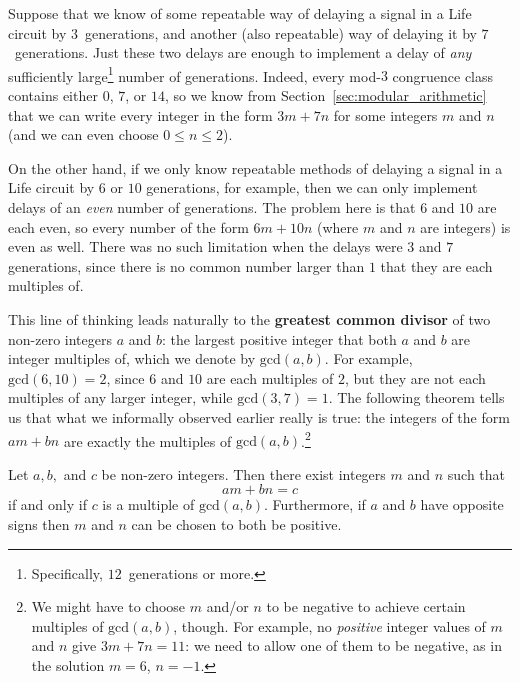 Suppose that we know of some repeatable way of delaying a signal in a Life circuit by $3$~generations, and another (also repeatable) way of delaying it by $7$~generations. Just these two delays are enough to implement a delay of \emph{any} sufficiently large\footnote{Specifically, $12$~generations or more.} number of generations. Indeed, every mod-$3$ congruence class contains either $0$, $7$, or $14$, so we know from Section~\ref{sec:modular_arithmetic} that we can write every integer in the form $3m + 7n$ for some integers $m$ and $n$ (and we can even choose $0 \leq n \leq 2$).

On the other hand, if we only know repeatable methods of delaying a signal in a Life circuit by $6$ or $10$ generations, for example, then we can only implement delays of an \emph{even} number of generations. The problem here is that $6$ and $10$ are each even, so every number of the form $6m + 10n$ (where $m$ and $n$ are integers) is even as well. There was no such limitation when the delays were $3$ and $7$ generations, since there is no common number larger than $1$ that they are each multiples of.

This line of thinking leads naturally to the \textbf{greatest common divisor} of two non-zero integers $a$ and $b$: the largest positive integer that both $a$ and $b$ are integer multiples of, which we denote by $\mathrm{gcd}(a,b)$. For example, $\mathrm{gcd}(6,10) = 2$, since $6$ and $10$ are each multiples of $2$, but they are not each multiples of any larger integer, while $\mathrm{gcd}(3,7) = 1$. The following theorem tells us that what we informally observed earlier really is true: the integers of the form $am + bn$ are exactly the multiples of $\mathrm{gcd}(a,b)$.\footnote{We might have to choose $m$ and/or $n$ to be negative to achieve certain multiples of $\mathrm{gcd}(a,b)$, though. For example, no \emph{positive} integer values of $m$ and $n$ give $3m + 7n = 11$: we need to allow one of them to be negative, as in the solution $m = 6$, $n = -1$.}

\begin{theorem}\label{thm:linear_diophantine}
	Let $a, b,$ and $c$ be non-zero integers. Then there exist integers $m$ and $n$ such that
	\[
		am + bn = c
	\]
	if and only if $c$ is a multiple of $\mathrm{gcd}(a,b)$. Furthermore, if $a$ and $b$ have opposite signs then $m$ and $n$ can be chosen to both be positive.
\end{theorem}

